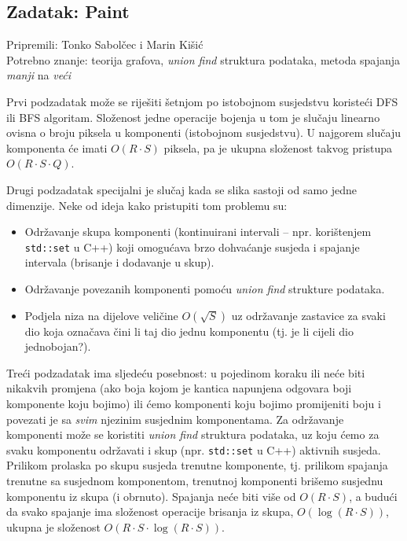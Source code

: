 \subsection*{Zadatak: Paint}
\textsf{Pripremili: Tonko Sabolčec i Marin Kišić}\\
\textsf{Potrebno znanje: teorija grafova, \textit{union find} struktura
podataka, metoda spajanja \textit{manji} na \textit{veći}}

Prvi podzadatak može se riješiti šetnjom po istobojnom susjedstvu koristeći DFS
ili BFS algoritam. Složenost jedne operacije bojenja u tom je slučaju linearno
ovisna o broju piksela u komponenti (istobojnom susjedstvu). U najgorem slučaju
komponenta će imati $O(R \cdot S)$ piksela, pa je ukupna složenost takvog
pristupa $O(R \cdot S \cdot Q)$.

Drugi podzadatak specijalni je slučaj kada se slika sastoji od samo jedne
dimenzije. Neke od ideja kako pristupiti tom problemu su:
\begin{itemize}[topsep=0pt]
  \item Održavanje skupa komponenti (kontinuirani intervali -- npr. korištenjem
    \verb|std::set| u C++) koji omogućava brzo dohvaćanje susjeda i spajanje
    intervala (brisanje i dodavanje u skup).
  \item Održavanje povezanih komponenti pomoću \textit{union find} strukture
    podataka.
  \item Podjela niza na dijelove veličine $O(\sqrt{S})$ uz održavanje
    zastavice za svaki dio koja označava čini li taj dio jednu komponentu
    (tj. je li cijeli dio jednobojan?).
\end{itemize}

Treći podzadatak ima sljedeću posebnost: u pojedinom koraku ili neće biti
nikakvih promjena (ako boja kojom je kantica napunjena odgovara boji komponente
koju bojimo) ili ćemo komponenti koju bojimo promijeniti boju i povezati je sa
\textit{svim} njezinim susjednim komponentama. Za održavanje komponenti može se
koristiti \textit{union find} struktura podataka, uz koju ćemo za svaku
komponentu održavati i skup (npr. \verb|std::set| u C++) aktivnih susjeda.
Prilikom prolaska po skupu susjeda trenutne komponente, tj. prilikom spajanja
trenutne sa susjednom komponentom, trenutnoj komponenti brišemo susjednu
komponentu iz skupa (i obrnuto).  Spajanja neće biti više od $O(R \cdot S)$, a
budući da svako spajanje ima složenost operacije brisanja iz skupa, $O(\log (R
\cdot S))$, ukupna je složenost $O(R \cdot S \cdot \log (R \cdot S))$.

